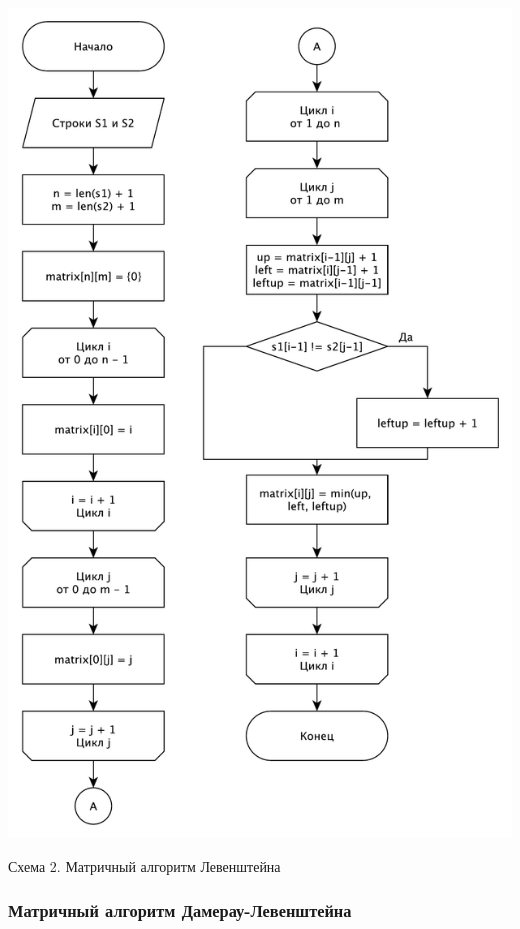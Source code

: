 \documentclass[a4paper,12pt]{article}
\begin{document}
\begin{center}
    \includegraphics[scale=0.7]{Lmatrix}

    Схема 2. Матричный алгоритм Левенштейна
\end{center}

\subsubsection{Матричный алгоритм Дамерау-Левенштейна}
\end{document}
